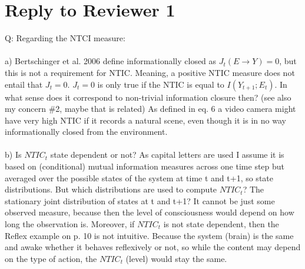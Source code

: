 \documentclass[utf8]{article}
\newcounter{cQuestion}[section]
\newenvironment{question}
    {\refstepcounter{cQuestion}\color{Blue}\noindent\newline Q\thecQuestion:}
    {~\newline}
\begin{document}
    \section{Reply to Reviewer 1}
        \begin{question}
            Regarding the NTCI measure: \\\\
            a) Bertschinger et al. 2006 define informationally closed as $J_t(E\rightarrow Y) = 0$, but this is not a requirement for NTIC. Meaning, a positive NTIC measure does not entail that $J_t = 0$. $J_t = 0$ is only true if the NTIC is equal to $I(Y_{t+1}; E_t)$. In what sense does it correspond to non-trivial information closure then? (see also my concern \#2, maybe that is related) As defined in eq. 6 a video camera might have very high NTIC if it records a natural scene, even though it is in no way informationally closed from the environment.\\\\
            b) Is $NTIC_t$ state dependent or not? As capital letters are used I assume it is based on (conditional) mutual information measures across one time step but averaged over the possible states of the system at time t and t+1, so state distributions. But which distributions are used to compute $NTIC_t$? The stationary joint distribution of states at t and t+1? It cannot be just some observed measure, because then the level of consciousness would depend on how long the observation is. Moreover, if $NTIC_t$ is not state dependent, then the Reflex example on p. 10 is not intuitive. Because the system (brain) is the same and awake whether it behaves reflexively or not, so while the content may depend on the type of action, the $NTIC_t$ (level) would stay the same.              
        \end{question}
    
\end{document}

